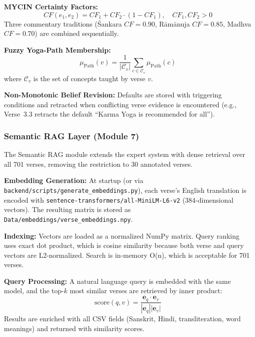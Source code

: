 \documentclass[conference]{IEEEtran}
\begin{document}
\textbf{MYCIN Certainty Factors:}
\begin{equation}
  CF(e_1, e_2) = CF_1 + CF_2 \cdot (1 - CF_1), \quad CF_1, CF_2 > 0
  \label{eq:mycin}
\end{equation}
Three commentary traditions (\'Sankara $CF = 0.90$, R\={a}m\={a}nuja
$CF = 0.85$, Madhva $CF = 0.70$) are combined sequentially.

\textbf{Fuzzy Yoga-Path Membership:}
\begin{equation}
  \mu_{\text{Path}}(v) = \frac{1}{|\mathcal{C}_v|}
  \sum_{c \in \mathcal{C}_v} \mu_{\text{Path}}(c)
  \label{eq:fuzzy}
\end{equation}
where $\mathcal{C}_v$ is the set of concepts taught by verse $v$.

\textbf{Non-Monotonic Belief Revision:} Defaults are stored with triggering
conditions and retracted when conflicting verse evidence is encountered
(e.g., Verse~3.3 retracts the default ``Karma Yoga is recommended for all'').

\subsubsection{Semantic RAG Layer (Module 7)}

The Semantic RAG module extends the expert system with dense retrieval
over all 701 verses, removing the restriction to 30 annotated verses.

\textbf{Embedding Generation:} At startup (or via \texttt{backend/scripts/generate\_embeddings.py}),
each verse's English translation is encoded with
\texttt{sentence-transformers/all-MiniLM-L6-v2} (384-dimensional vectors).
The resulting matrix is stored as \texttt{Data/embeddings/verse\_embeddings.npy}.

\textbf{Indexing:} Vectors are loaded as a normalized NumPy matrix. Query ranking uses exact dot product, which is cosine similarity because both verse and query vectors are L2-normalized. Search is in-memory O(n), which is acceptable for 701 verses.

\textbf{Query Processing:} A natural language query is embedded with the
same model, and the top-$k$ most similar verses are retrieved by inner
product:
\begin{equation}
  \text{score}(q, v) = \frac{\mathbf{e}_q \cdot \mathbf{e}_v}
  {|\mathbf{e}_q||\mathbf{e}_v|}
  \label{eq:cosine}
\end{equation}
Results are enriched with all CSV fields (Sanskrit, Hindi, transliteration,
word meanings) and returned with similarity scores.
\end{document}
